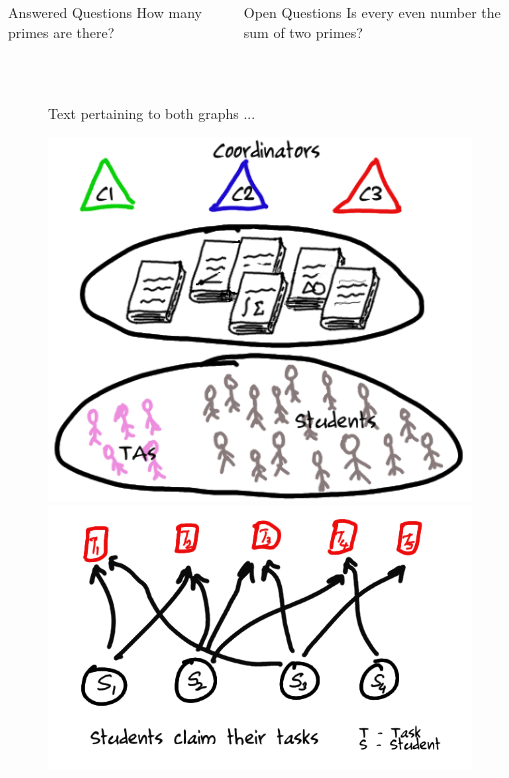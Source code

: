 \begin{columns}
\begin{block}{Answered Questions}
How many primes are there?
\end{block}
\begin{block}{Open Questions}
Is every even number the sum of two primes?
\end{block}
\end{columns}

\begin{figure}
\centering
\mbox{\quad
{}}
\caption{Text pertaining to both graphs ...} \label{fig12}
\end{figure}

\begin{figure}[ht]
\begin{minipage}[b]{0.5\linewidth}
\centering
\includegraphics[scale=0.15]{1.png}
\end{minipage}
\hspace{0.5cm}
\begin{minipage}[b]{0.5\linewidth}
\centering
\includegraphics[scale=0.15]{2.png}

\end{minipage}
\end{figure}
